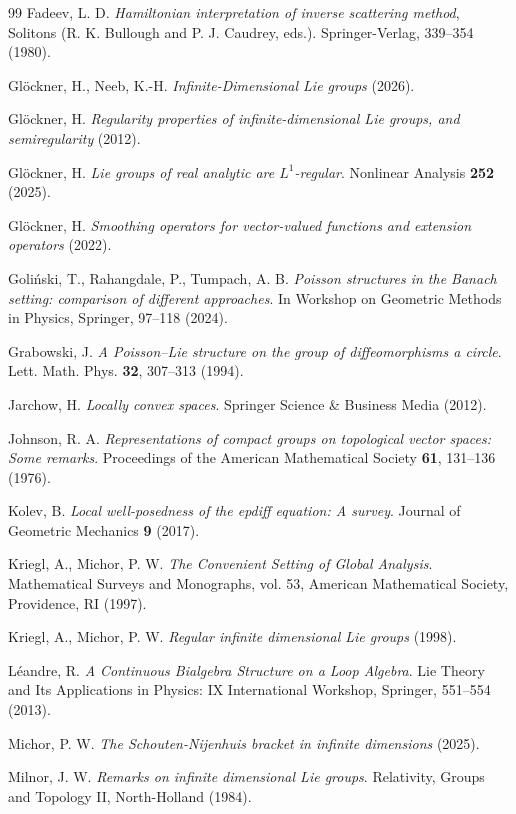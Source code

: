 \documentclass[11pt,reqno]{amsart}
\theoremstyle{definition}
\numberwithin{equation}{section}
\begin{document}
\begin{thebibliography}{99}
 Fadeev, L. D. \textit{Hamiltonian interpretation of inverse scattering method}, Solitons (R. K. Bullough and P. J. Caudrey, eds.). Springer-Verlag, 339--354 (1980).

 Glöckner, H., Neeb, K.-H. \textit{Infinite-Dimensional Lie groups} (2026).

 Glöckner, H. \textit{Regularity properties of infinite-dimensional Lie groups, and semiregularity} (2012).

 Glöckner, H. \textit{Lie groups of real analytic are $L^1$-regular}. Nonlinear Analysis \textbf{252} (2025).

 Glöckner, H. \textit{Smoothing operators for vector-valued functions and extension operators} (2022).

 Goliński, T., Rahangdale, P., Tumpach, A. B. \textit{Poisson structures in the Banach setting: comparison of different approaches}. In Workshop on Geometric Methods in Physics, Springer, 97--118 (2024).

 Grabowski, J. \textit{A Poisson–Lie structure on the group of diffeomorphisms a circle}. Lett. Math. Phys. \textbf{32}, 307--313 (1994).

 Jarchow, H. \textit{Locally convex spaces}. Springer Science \& Business Media (2012).

 Johnson, R. A. \textit{Representations of compact groups on topological vector spaces: Some remarks}. Proceedings of the American Mathematical Society \textbf{61}, 131--136 (1976).

 Kolev, B. \textit{Local well-posedness of the epdiff equation: A survey}. Journal of Geometric Mechanics \textbf{9} (2017).

 Kriegl, A., Michor, P. W. \textit{The Convenient Setting of Global Analysis}. Mathematical Surveys and Monographs, vol. 53, American Mathematical Society, Providence, RI (1997).

 Kriegl, A., Michor, P. W. \textit{Regular infinite dimensional Lie groups} (1998).

 Léandre, R. \textit{A Continuous Bialgebra Structure on a Loop Algebra}. Lie Theory and Its Applications in Physics: IX International Workshop, Springer, 551--554 (2013).

 Michor, P. W. \textit{The Schouten-Nijenhuis bracket in infinite dimensions} (2025).

 Milnor, J. W. \textit{Remarks on infinite dimensional Lie groups}. Relativity, Groups and Topology II, North-Holland (1984).


\end{thebibliography}
\end{document}
